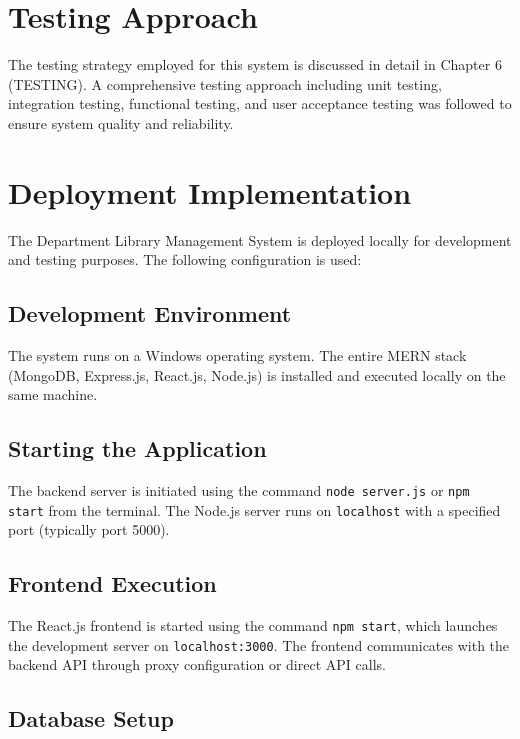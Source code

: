 \documentclass[12pt,a4paper]{report}
\begin{document}
\section{Testing Approach}
\label{sec:testingapproachl}

The testing strategy employed for this system is discussed in detail in Chapter 6 (TESTING). 
A comprehensive testing approach including unit testing, integration testing, functional 
testing, and user acceptance testing was followed to ensure system quality and reliability.


\section{Deployment Implementation}
\label{sec:deploymentimpl}

The Department Library Management System is deployed locally for development and testing purposes. The following configuration is used:

\subsection{Development Environment}

The system runs on a Windows operating system. The entire MERN stack (MongoDB, Express.js, React.js, Node.js) is installed and executed locally on the same machine.

\subsection{Starting the Application}

The backend server is initiated using the command \texttt{node server.js} or \texttt{npm start} from the terminal. The Node.js server runs on \texttt{localhost} with a specified port (typically port 5000).

\subsection{Frontend Execution}

The React.js frontend is started using the command \texttt{npm start}, which launches the development server on \texttt{localhost:3000}. The frontend communicates with the backend API through proxy configuration or direct API calls.

\subsection{Database Setup}
\end{document}

